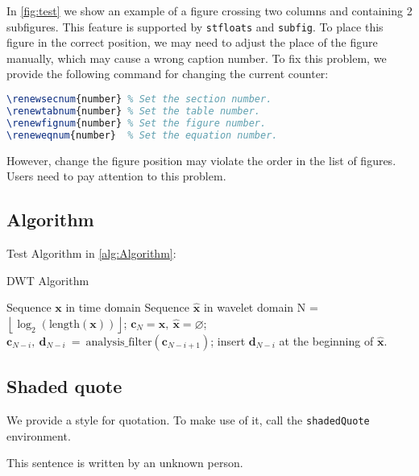 \begin{multicols}{2}
In \autoref{fig:test} we show an example of a figure crossing two columns and containing 2 subfigures. This feature is supported by \texttt{stfloats} and \texttt{subfig}. To place this figure in the correct position, we may need to adjust the place of the figure manually, which may cause a wrong caption number. To fix this problem, we provide the following command for changing the current counter:

\begin{lstlisting}[language=tex]
\renewsecnum{number} % Set the section number.
\renewtabnum{number} % Set the table number.
\renewfignum{number} % Set the figure number.
\reneweqnum{number}  % Set the equation number.
\end{lstlisting}

However, change the figure position may violate the order in the list of figures. Users need to pay attention to this problem.

\subsection{Algorithm}

Test Algorithm in \autoref{alg:Algorithm}:

\begin{algorithm}[H]
  \caption{DWT Algorithm}
  \label{alg:Algorithm}
  \begin{algorithmic}[1]
    \REQUIRE Sequence $\mathbf{x}$ in time domain
    \ENSURE Sequence $\hat{\mathbf{x}}$ in wavelet domain
    \STATE N = $\left\lfloor \log_2 (\mathrm{length}(\mathbf{x})) \right\rfloor$;
    \STATE $\mathbf{c}_{N} = \mathbf{x},~ \hat{\mathbf{x}} = \varnothing$;
    \STATE $\mathbf{c}_{N-i},~\mathbf{d}_{N-i}~=~\mathrm{analysis\_filter}(\mathbf{c}_{N-i+1})$;
    \STATE insert $\mathbf{d}_{N-i}$ at the beginning of $\hat{\mathbf{x}}$.
    \ENDFOR
  \end{algorithmic}
\end{algorithm}

\subsection{Shaded quote}

We provide a style for quotation. To make use of it, call the \texttt{shadedQuote} environment.

\begin{shadeQuote}{}
  This sentence is written by an unknown person.
\end{shadeQuote}


\end{multicols}
